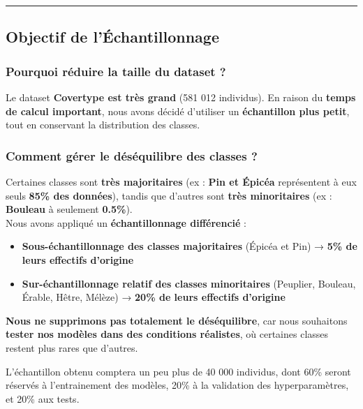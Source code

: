 \documentclass[
  letterpaper,
  DIV=11,
  numbers=noendperiod]{scrartcl}
\providecommand{\tightlist}{%
  \setlength{\itemsep}{0pt}\setlength{\parskip}{0pt}}\usepackage{longtable,booktabs,array}
\begin{document}
\begin{center}\rule{0.5\linewidth}{0.5pt}\end{center}

\subsection{Objectif de
l'Échantillonnage}\label{objectif-de-luxe9chantillonnage}

\subsubsection{Pourquoi réduire la taille du dataset
?}\label{pourquoi-ruxe9duire-la-taille-du-dataset}

Le dataset \textbf{Covertype est très grand} (581 012 individus). En
raison du \textbf{temps de calcul important}, nous avons décidé
d'utiliser un \textbf{échantillon plus petit}, tout en conservant la
distribution des classes.

\subsubsection{Comment gérer le déséquilibre des classes
?}\label{comment-guxe9rer-le-duxe9suxe9quilibre-des-classes}

Certaines classes sont \textbf{très majoritaires} (ex : \textbf{Pin et
Épicéa} représentent à eux seuls \textbf{85\% des données}), tandis que
d'autres sont \textbf{très minoritaires} (ex : \textbf{Bouleau} à
seulement \textbf{0.5\%}).\\
Nous avons appliqué un \textbf{échantillonnage différencié} :

\begin{itemize}
\tightlist
\item
  \textbf{Sous-échantillonnage des classes majoritaires} (Épicéa et Pin)
  → \textbf{5\% de leurs effectifs d'origine}
\item
  \textbf{Sur-échantillonnage relatif des classes minoritaires}
  (Peuplier, Bouleau, Érable, Hêtre, Mélèze) → \textbf{20\% de leurs
  effectifs d'origine}
\end{itemize}

\textbf{Nous ne supprimons pas totalement le déséquilibre}, car nous
souhaitons \textbf{tester nos modèles dans des conditions réalistes}, où
certaines classes restent plus rares que d'autres.

L'échantillon obtenu comptera un peu plus de 40 000 individus, dont 60\%
seront réservés à l'entrainement des modèles, 20\% à la validation des
hyperparamètres, et 20\% aux tests.
\end{document}
